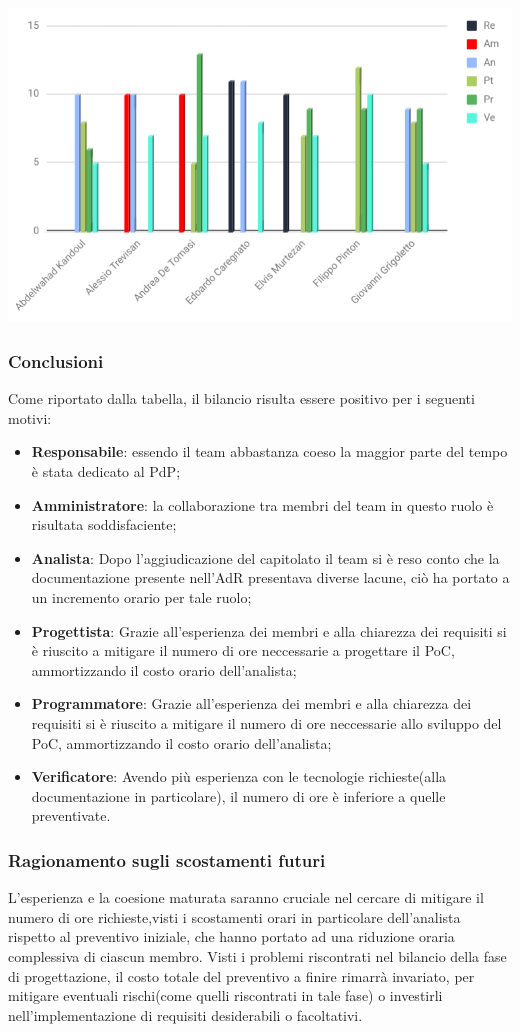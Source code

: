 \includegraphics[width=1\textwidth]{./src/Preventivo/src/img/istoConsuntivoProgettazioneRuoli.png}

\subsubsection{Conclusioni}
Come riportato dalla tabella, il bilancio risulta essere positivo per i seguenti motivi:
\begin{itemize}
	\item \textbf{Responsabile}: {essendo il team abbastanza coeso la maggior parte del tempo è stata dedicato al PdP;}
	\item \textbf{Amministratore}: {la collaborazione tra membri del team in questo ruolo è risultata soddisfaciente;}
	\item \textbf{Analista}: {Dopo l'aggiudicazione del capitolato il team si è reso conto che la documentazione presente nell'AdR presentava diverse lacune, ciò ha portato a un incremento orario per tale ruolo;}
	\item \textbf{Progettista}: {Grazie all'esperienza dei membri e alla chiarezza dei requisiti si è riuscito a mitigare il numero di ore neccessarie a progettare il PoC, ammortizzando il costo orario dell'analista;}
	\item \textbf{Programmatore}: {Grazie all'esperienza dei membri e alla chiarezza dei requisiti si è riuscito a mitigare il numero di ore neccessarie allo sviluppo del PoC, ammortizzando il costo orario dell'analista;}
	\item \textbf{Verificatore}: {Avendo più esperienza con le tecnologie richieste(alla documentazione in particolare), il numero di ore è inferiore a quelle preventivate.}
\end{itemize}
\subsubsection{Ragionamento sugli scostamenti futuri}
L'esperienza e la coesione maturata saranno cruciale nel cercare di mitigare il numero di ore richieste,visti i scostamenti orari in particolare dell'analista rispetto al preventivo iniziale, che hanno portato ad una riduzione oraria complessiva di ciascun membro.
Visti i problemi riscontrati nel bilancio della fase di progettazione, il costo totale del preventivo a finire rimarrà invariato, per mitigare eventuali rischi(come quelli riscontrati in tale fase) o investirli nell'implementazione di requisiti desiderabili o facoltativi.
